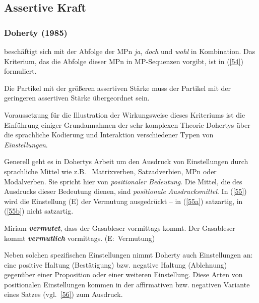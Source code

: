 \subsection{Assertive Kraft}
\label{sec:ass}
\subsubsection{Doherty (1985)}
\label{sec:doh85}
\citet{Doherty1985} beschäftigt sich mit der Abfolge der MPn \textit{ja}, \textit{doch} und \textit{wohl} in Kombination. Das Kriterium, das die Abfolge dieser MPn in MP-Sequenzen vorgibt, ist in (\ref{54}) formuliert. 

\begin{exe}
	\ex\label{54} 
		Die Partikel mit der größeren assertiven Stärke muss der Partikel mit der geringeren assertiven Stärke übergeordnet sein.   
			\hfill\hbox{\citet[83]{Doherty1985}}
\end{exe}
Voraussetzung für die Illustration der Wirkungsweise dieses Kriteriums ist die Einführung einiger Grundannahmen der sehr komplexen Theorie Dohertys über die sprachliche Kodierung und Interaktion verschiedener Typen von \textit{Einstellungen}. 

Generell geht es in Dohertys Arbeit um den Ausdruck von Einstellungen durch sprachliche Mittel wie z.B.\  Matrixverben, Satzadverbien, MPn  oder  Modalverben. Sie spricht hier von \textit{positionaler Bedeutung}. Die Mittel, die des Ausdrucks dieser Bedeutung dienen, sind \textit{positionale Ausdrucksmittel}. In (\ref{55}) wird die Einstellung (E) der Vermutung ausgedrückt – in  (\ref{55a}) satzartig, in (\ref{55b}) nicht satzartig.

\begin{exe}
	\ex\label{55} 
		\begin{xlist}	
			\ex\label{55a} Miriam \textbf{\textit{vermutet}}, dass der Gasableser vormittags kommt. 
			\ex\label{55b} Der Gasableser kommt \textbf{\textit{vermutlich}} vormittags. \hfill\hbox{(E: Vermutung)}
		\end{xlist}
\end{exe}
Neben solchen spezifischen Einstellungen nimmt Doherty auch  Einstellungen  an: eine positive Haltung (Bestätigung) bzw. negative Haltung (Ableh\-nung) gegenüber einer Proposition oder einer weiteren Einstellung. Diese Arten von positionalen Einstellungen kommen in der affirmativen bzw. negativen Variante eines Satzes (vgl.\ \ref{56}) zum Ausdruck.

